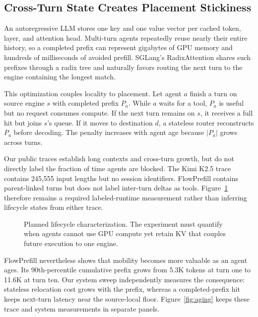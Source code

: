 \subsection{Cross-Turn State Creates Placement Stickiness}\label{cross-turn-state-creates-placement-stickiness}

An autoregressive LLM stores one key and one value vector per cached token, layer, and attention head. Multi-turn agents repeatedly reuse nearly their entire history, so a completed prefix can represent gigabytes of GPU memory and hundreds of milliseconds of avoided prefill. SGLang's RadixAttention \cite{sglang} shares such prefixes through a radix tree and naturally favors routing the next turn to the engine containing the longest match.

This optimization couples locality to placement. Let agent \(a\) finish a turn on source engine \(s\) with completed prefix \(P_a\). While \(a\) waits for a tool, \(P_a\) is useful but no request consumes compute. If the next turn remains on \(s\), it receives a full hit but joins \(s\)'s queue. If it moves to destination \(d\), a stateless router reconstructs \(P_a\) before decoding. The penalty increases with agent age because \(|P_a|\) grows across turns.

Our public traces establish long contexts and cross-turn growth, but do not directly label the fraction of time agents are blocked. The Kimi K2.5 trace contains 245,555 input lengths but no session identifiers. FlowPrefill contains parent-linked turns but does not label inter-turn deltas as tools. Figure~\ref{fig:lifecycle} therefore remains a required labeled-runtime measurement rather than inferring lifecycle states from either trace.

\begin{figure}[t]
  \centering
  \caption{Planned lifecycle characterization. The experiment must quantify when agents cannot use GPU compute yet retain KV that couples future execution to one engine.}
  \label{fig:lifecycle}
\end{figure}

FlowPrefill nevertheless shows that mobility becomes more valuable as an agent ages. Its 90th-percentile cumulative prefix grows from 5.3K tokens at turn one to 11.6K at turn ten. Our system sweep independently measures the consequence: stateless relocation cost grows with the prefix, whereas a completed-prefix hit keeps next-turn latency near the source-local floor. Figure~\ref{fig:aging} keeps these trace and system measurements in separate panels.

